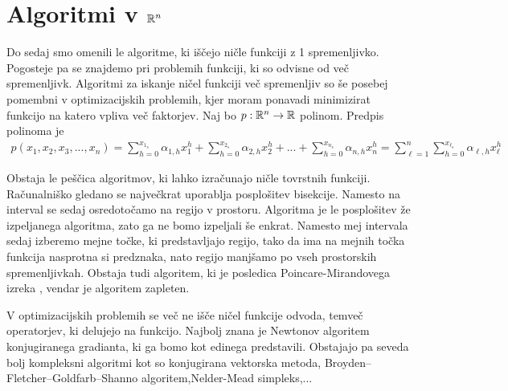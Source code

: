 \chapter{Algoritmi v $\mathbb{R}^n$}
Do sedaj smo omenili le algoritme, ki iščejo ničle funkciji z 1 spremenljivko. Pogosteje pa se znajdemo pri problemih funkciji, ki so odvisne od več spremenljivk. Algoritmi za iskanje ničel funkciji več spremenljiv so še posebej pomembni v optimizacijskih problemih, kjer moram ponavadi minimizirat funkcijo na katero vpliva več faktorjev. Naj bo $p: \mathbb{R}^n \to \mathbb{R}$ polinom. Predpis polinoma je
\begin{align}
    p(x_1, x_2, x_3, ..., x_n) = \sum_{h = 0}^{x_1_{s}} \alpha_{1,h} x_1^h + \sum_{h = 0}^{x_2_{s}} \alpha_{2,h} x_2^h + ... + \sum_{h = 0}^{x_n_{s}} \alpha_{n,h} x_n^h = \sum_{\ell = 1}^n\sum_{h=0}^{x_{\ell}_s} \alpha_{\ell, h} x_\ell^h
\end{align}

Obstaja le peščica algoritmov, ki lahko izračunajo ničle tovrstnih funkciji. Računalniško gledano se največkrat uporablja posplošitev bisekcije. Namesto na interval se sedaj osredotočamo na regijo v prostoru. Algoritma je le posplošitev že izpeljanega algoritma, zato ga ne bomo izpeljali še enkrat. Namesto mej intervala sedaj izberemo mejne točke, ki predstavljajo regijo, tako da ima na mejnih točka funkcija nasprotna si predznaka, nato regijo manjšamo po vseh prostorskih spremenljivkah. Obstaja tudi algoritem, ki je posledica Poincare-Mirandovega izreka \cite{Kulpa1997}, vendar je algoritem zapleten.

V optimizacijskih problemih se več ne išče ničel funkcije odvoda, temveč operatorjev, ki delujejo na funkcijo. Najbolj znana je Newtonov algoritem konjugiranega gradianta, ki ga bomo kot edinega predstavili. Obstajajo pa seveda bolj kompleksni algoritmi kot so konjugirana vektorska metoda, Broyden–Fletcher–Goldfarb–Shanno algoritem,Nelder-Mead simpleks,... 

